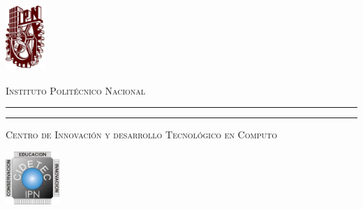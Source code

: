 \documentclass[letter]{letter}
\begin{document}
	
	\thispagestyle{empty}
	
	\begin{minipage}[c][0.1\textheight][c]{0.2\textwidth}
		\begin{center}
			\includegraphics[width=1.5cm, height=2.6cm]{logo_ipn}
		\end{center}
	\end{minipage}
	\begin{minipage}[c][0.1\textheight][t]{0.6\textwidth}
		\begin{center}
			{\scshape {\Large Instituto Polit\'ecnico Nacional}}
			\vspace{.3cm}
			\hrule height2.5pt
			\vspace{.1cm}
			\hrule height1pt
			\vspace{.3cm}
			{\scshape  {\large Centro de Innovaci\'on y desarrollo Tecnol\'ogico en Computo} }
		\end{center}
	\end{minipage}
	\begin{minipage}[c][0.1\textheight][c]{0.2\textwidth}
			\begin{center}
				\includegraphics[height=2cm]{logo_cidetec}
			\end{center}
	\end{minipage}
	
	\vspace{1cm}
	
\end{document}
